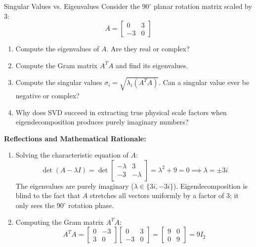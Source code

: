 \begin{ponderbox}{Singular Values vs. Eigenvalues}
Consider the $90^\circ$ planar rotation matrix scaled by 3:
\begin{equation*}
A = \begin{bmatrix} 0 & 3 \\ -3 & 0 \end{bmatrix}
\end{equation*}
\begin{enumerate}
    \item Compute the eigenvalues of $A$. Are they real or complex?
    \item Compute the Gram matrix $A^T A$ and find its eigenvalues.
    \item Compute the singular values $\sigma_i = \sqrt{\lambda_i(A^T A)}$. Can a singular value ever be negative or complex?
    \item Why does SVD succeed in extracting true physical scale factors when eigendecomposition produces purely imaginary numbers?
\end{enumerate}
\tcblower
\textbf{Reflections and Mathematical Rationale:}
\begin{enumerate}
    \item Solving the characteristic equation of $A$:
    \begin{equation*}
    \det(A - \lambda I) = \det\begin{bmatrix} -\lambda & 3 \\ -3 & -\lambda \end{bmatrix} = \lambda^2 + 9 = 0 \implies \lambda = \pm 3i
    \end{equation*}
    The eigenvalues are purely imaginary ($\lambda \in \{3i, -3i\}$). Eigendecomposition is blind to the fact that $A$ stretches all vectors uniformly by a factor of 3; it only sees the $90^\circ$ rotation phase.
    \item Computing the Gram matrix $A^T A$:
    \begin{equation*}
    A^T A = \begin{bmatrix} 0 & -3 \\ 3 & 0 \end{bmatrix} \begin{bmatrix} 0 & 3 \\ -3 & 0 \end{bmatrix} = \begin{bmatrix} 9 & 0 \\ 0 & 9 \end{bmatrix} = 9 I_2
    \end{equation*}

\end{enumerate}
\end{ponderbox}
